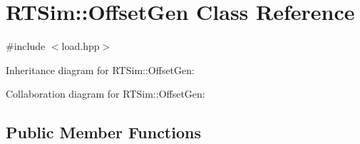 \hypertarget{classRTSim_1_1OffsetGen}{}\section{R\+T\+Sim\+:\+:Offset\+Gen Class Reference}
\label{classRTSim_1_1OffsetGen}


{\ttfamily \#include $<$load.\+hpp$>$}



Inheritance diagram for R\+T\+Sim\+:\+:Offset\+Gen\+:


Collaboration diagram for R\+T\+Sim\+:\+:Offset\+Gen\+:
\subsection*{Public Member Functions}
